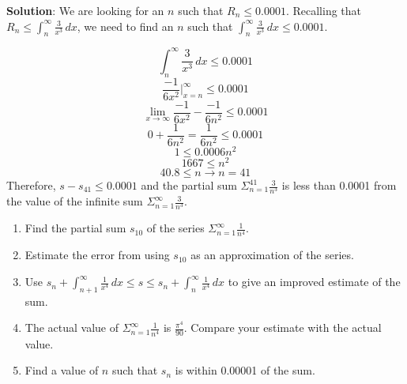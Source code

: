 \textbf{Solution}: We are looking for an $n$ such that $R_n \leq 0.0001$. 
Recalling that $R_n \leq \int_{n}^\infty \frac{3}{x^3}\,dx$, we need to find 
an $n$ such that $\int_{n}^\infty \frac{3}{x^3}\,dx \leq 0.0001$. 

$$\int_n^\infty \frac{3}{x^3}\,dx \leq 0.0001$$
$$\frac{-1}{6x^2}|_{x=n}^\infty \leq 0.0001$$
$$\lim_{x \to \infty} \frac{-1}{6x^2} - \frac{-1}{6n^2} \leq 0.0001$$
$$0 + \frac{1}{6n^2} = \frac{1}{6n^2} \leq 0.0001$$
$$1 \leq 0.0006n^2$$
$$1667 \leq n^2$$
$$40.8 \leq n \rightarrow n = 41$$
Therefore, $s - s_{41} \leq 0.0001$ and the partial sum $\Sigma_{n=1}^{41} 
\frac{3}{n^3}$ is less than 0.0001 from the value of the infinite sum $\Sigma_
{n=1}^\infty \frac{3}{n^3}$.

\begin{Exercise}[label=remainder1]
\begin{enumerate}
\item Find the partial sum $s_{10}$ of the series $\Sigma_{n=1}^\infty 
\frac{1}{n^4}$. 
\item Estimate the error from using $s_{10}$ as an approximation of the series.
\item Use $s_n + \int_{n+1}^\infty \frac{1}{x^4}\,dx \leq s \leq s_n + \int_n^
\infty \frac{1}{x^4}\,dx$ to give an improved estimate of the sum.
\item The actual value of $\Sigma_{n=1}^\infty \frac{1}{n^4}$ is 
$\frac{\pi^4}{90}$. Compare your estimate with the actual value.
\item Find a value of $n$ such that $s_n$ is within 0.00001 of the sum. 
\end{enumerate}
\vspace{50mm}
\end{Exercise}

